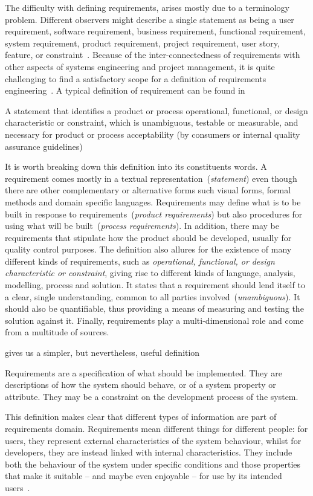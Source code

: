 \documentclass[dissertation,final]{softeng}
\begin{document}
The difficulty with defining requirements, arises mostly due to a terminology problem. Different observers might describe a single statement as being a user requirement, software requirement, business requirement, functional requirement, system requirement, product requirement, project requirement, user story, feature, or constraint~\citep{Wiegers2013}. Because of the inter-connectedness of requirements with other aspects of systems engineering and project management, it is quite challenging to find a satisfactory scope for a definition of requirements engineering~\citep{Hull2011}. A typical definition of requirement can be found in ~
\begin{displayquote}
A statement that identifies a product or process operational, functional, or design characteristic or constraint, which is unambiguous, testable or measurable, and necessary for product or process acceptability (by consumers or internal quality assurance guidelines)
\end{displayquote}
It is worth breaking down this definition into its constituents words. A requirement comes mostly in a textual representation~(\emph{statement}) even though there are other complementary or alternative forms such visual forms, formal methods and domain specific languages. Requirements may define what is to be built in response to requirements~(\emph{product requirements}) but also procedures for using what will be built~(\emph{process requirements}). In addition, there may be requirements that stipulate how the product should be developed, usually for quality control purposes. The definition also allures for the existence of many different kinds of requirements, such as \emph{operational, functional, or design characteristic or constraint}, giving rise to different kinds of language, analysis, modelling, process and solution. It states that a requirement should lend itself to a clear, single understanding, common to all parties involved~(\emph{unambiguous}). It should also be quantifiable, thus providing a means of measuring and testing the solution against it. Finally, requirements play a multi-dimensional role and come from a multitude of sources. 

\citet{Sommerville:1997} gives us a simpler, but nevertheless, useful definition
\begin{displayquote}
Requirements are a specification of what should be implemented. They are descriptions of how the system should behave, or of a system property or attribute. They may be a constraint on the development process of the system.
\end{displayquote}
This definition makes clear that different types of information are part of requirements domain. Requirements mean different things for different people: for users, they represent external characteristics of the system behaviour, whilst for developers, they are instead linked with internal characteristics. They include both the behaviour of the system under specific conditions and those properties that make it suitable -- and maybe even enjoyable -- for use by its intended users~\citep{Wiegers2013}.
\end{document}
